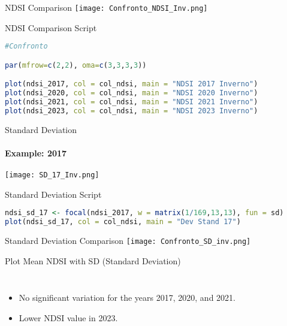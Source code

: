 \documentclass[10pt]{beamer}
\begin{document}
\begin{frame}{NDSI Comparison}
    \centering
    \texttt{[image: Confronto\_NDSI\_Inv.png]}
\end{frame}

\begin{frame}[fragile]{NDSI Comparison Script }
    \begin{lstlisting}[language=R]
#Confronto

par(mfrow=c(2,2), oma=c(3,3,3,3))

plot(ndsi_2017, col = col_ndsi, main = "NDSI 2017 Inverno")
plot(ndsi_2020, col = col_ndsi, main = "NDSI 2020 Inverno")
plot(ndsi_2021, col = col_ndsi, main = "NDSI 2021 Inverno")
plot(ndsi_2023, col = col_ndsi, main = "NDSI 2023 Inverno")

    \end{lstlisting}
\end{frame}

\begin{frame}{Standard Deviation}
\framesubtitle{Example: 2017}
    \centering
    \texttt{[image: SD\_17\_Inv.png]}
\end{frame}
\begin{frame}[fragile]{Standard Deviation Script}
    \begin{lstlisting}[language=R]
ndsi_sd_17 <- focal(ndsi_2017, w = matrix(1/169,13,13), fun = sd)
plot(ndsi_sd_17, col = col_ndsi, main = "Dev Stand 17")
    \end{lstlisting}
\end{frame}
\begin{frame}{Standard Deviation Comparison}
    \centering
    \texttt{[image: Confronto\_SD\_inv.png]}
\end{frame}

\begin{frame}{Plot Mean NDSI with SD (Standard Deviation)}
    \begin{columns}
            \begin{itemize}
                \item<1->No significant variation for the years 2017, 2020, and 2021.
                \item<2->Lower NDSI value in 2023.
            \end{itemize}
    \end{columns}
    
\end{frame}
\end{document}
